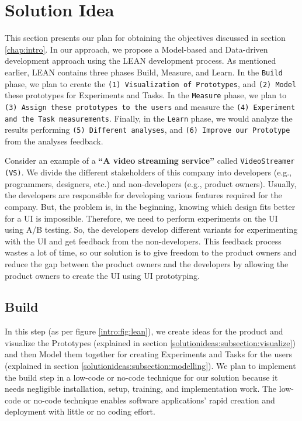 \chapter{Solution Idea} \label{chap:solutionideas}

This section presents our plan for obtaining the objectives discussed in section \ref{chap:intro}. 
In our approach, we propose a Model-based and Data-driven development approach using the LEAN development process. 
As mentioned earlier, LEAN contains three phases Build, Measure, and Learn.
In the \texttt{Build} phase, we plan to create the \texttt{(1) Visualization of Prototypes}, and \texttt{(2) Model} these prototypes for Experiments and Tasks.
In the \texttt{Measure} phase, we plan to \texttt{(3) Assign these prototypes to the users} and measure the \texttt{(4) Experiment and the Task measurements}.
Finally, in the \texttt{Learn} phase, we would analyze the results performing \texttt{(5) Different analyses}, and \texttt{(6) Improve our Prototype} from the analyses feedback.  

Consider an example of a \textbf{``A video streaming service''} called \texttt{VideoStreamer (VS)}.
We divide the different stakeholders of this company into developers (e.g., programmers, designers, etc.) and non-developers (e.g., product owners).
Usually, the developers are responsible for developing various features required for the company. 
But, the problem is, in the beginning, knowing which design fits better for a UI is impossible. 
Therefore, we need to perform experiments on the UI using A/B testing.
So, the developers develop different variants for experimenting with the UI and get feedback from the non-developers.
This feedback process wastes a lot of time, so our solution is to give freedom to the product owners and reduce the gap between the product owners and the developers by allowing the product owners to create the UI using UI prototyping.

\section{Build}
In this step (as per figure \ref{intro:fig:lean}), we create ideas for the product and visualize the Prototypes (explained in section \ref{solutionideas:subsection:visualize}) and then Model them together for creating Experiments and Tasks for the users (explained in section \ref{solutionideas:subsection:modelling}).
We plan to implement the build step in a low-code or no-code technique for our solution because it needs negligible installation, setup, training, and implementation work.
The low-code or no-code technique enables software applications' rapid creation and deployment with little or no coding effort.

